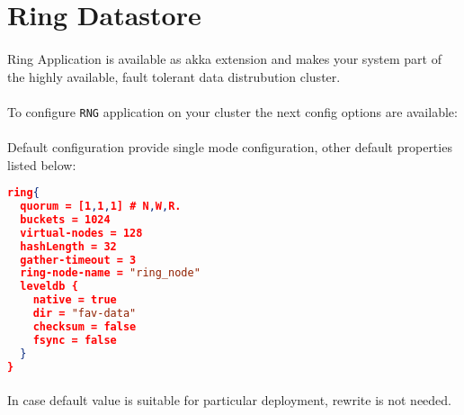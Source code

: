 \section{Ring Datastore}
\paragraph{}
Ring Application is available as akka extension and makes your system part of the highly available, fault tolerant data distrubution cluster.

\paragraph{}
To configure \texttt{RNG} application on your cluster the next config options are available:

\paragraph{}
Default configuration provide single mode configuration, other default properties listed below:

\begin{lstlisting}[language=json,caption=Example]
ring{
  quorum = [1,1,1] # N,W,R.
  buckets = 1024
  virtual-nodes = 128
  hashLength = 32
  gather-timeout = 3
  ring-node-name = "ring_node"
  leveldb {
    native = true
    dir = "fav-data"
    checksum = false
    fsync = false
  }
}
\end{lstlisting}

\paragraph{}
In case default value is suitable for particular deployment, rewrite is not needed.

